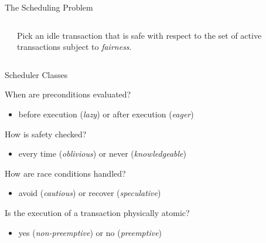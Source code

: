 \documentclass{beamer}
\begin{document}
\begin{frame}{The Scheduling Problem}

  \begin{columns}
    \begin{column}{.5\textwidth}
    \end{column}
    \begin{column}{.5\textwidth}
      Pick an idle transaction that is {\color{green}safe} with respect to the set of active transactions subject to \emph{fairness}.
    \end{column}
  \end{columns}

\end{frame}

\begin{frame}{Scheduler Classes}

  When are preconditions evaluated?
  \begin{itemize}
  \item before execution (\emph{lazy}) or after execution (\emph{eager})
  \end{itemize}

  \vspace*{12pt}

  How is safety checked?
  \begin{itemize}
  \item every time (\emph{oblivious}) or never (\emph{knowledgeable})
  \end{itemize}

  \vspace*{12pt}

  How are race conditions handled?
  \begin{itemize}
  \item avoid (\emph{cautious}) or recover (\emph{speculative})
  \end{itemize}

  \vspace*{12pt}

  Is the execution of a transaction physically atomic?
  \begin{itemize}
  \item yes (\emph{non-preemptive}) or no (\emph{preemptive})
  \end{itemize}

\end{frame}
\end{document}
